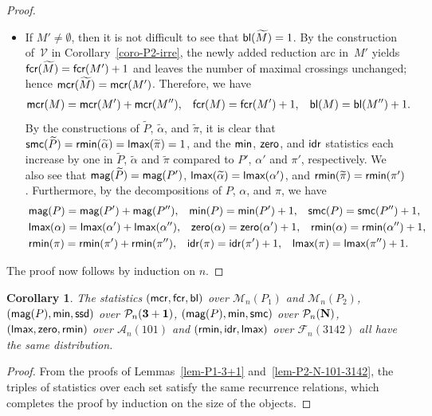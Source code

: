 \documentclass[11pt]{article}
\DeclareMathOperator{\bl}{\mbox{\sf{bl}}}
\DeclareMathOperator{\mcr}{\mbox{\sf{mcr}}}
\DeclareMathOperator{\smc}{\mbox{\sf{smc}}}
\DeclareMathOperator{\magg}{\mbox{\sf{mag}}}
\DeclareMathOperator{\minn}{\mbox{\sf{min}}}
\DeclareMathOperator{\ssd}{\mbox{\sf{ssd}}}
\DeclareMathOperator{\idr}{\mbox{\sf{idr}}}
\DeclareMathOperator{\lmax}{\mbox{\sf{lmax}}}
\DeclareMathOperator{\rmin}{\mbox{\sf{rmin}}}
\DeclareMathOperator{\zero}{\mbox{\sf{zero}}}
\DeclareMathOperator{\fcr}{\mbox{\sf{fcr}}}
\newtheorem{coro}[thm]{Corollary}
\newcommand{\A}{\mathcal{A}}
\newcommand{\PP}{{\mathcal P}}
\newcommand{\F}{\mathcal{F}}
\newcommand{\M}{\mathcal{M}}
\newcommand{\V}{\mathcal{V}}
\begin{document}
\begin{proof}
\begin{itemize}
			\item If $M' \neq \emptyset$, then it is not difficult to see that $\bl(\widetilde{M})= 1$.
			By the construction of~$\V$ in Corollary~\ref{coro-P2-irre}, the newly added reduction arc in~$M'$ yields $\fcr(\widetilde{M})=\fcr(M')+1$
			and leaves the number of maximal crossings unchanged; hence $\mcr(\widetilde{M})=\mcr(M')$.
			Therefore, we have
			\begin{align*}
				\mcr(M)= \mcr(M')+\mcr(M''), \hspace{0.3cm}  \fcr(M)=\fcr(M')+1, \hspace{0.3cm} \bl(M)=\bl(M'')+1.
			\end{align*}
			By the constructions of $\widetilde P$, $\widetilde \alpha$, and $\widetilde \pi$, it is clear that
			$\smc(\widetilde{P})=\rmin(\widetilde{\alpha})=\lmax(\widetilde{\pi})=1$,
			and the $\minn$, $\zero$, and $\idr$ statistics each increase by one in
			$\widetilde{P}$, $\widetilde{\alpha}$ and $\widetilde{\pi}$
			compared to $P'$, $\alpha'$ and $\pi'$, respectively.
			We also see that
			$\magg(\widetilde P)= \magg(P')$,
			$\lmax(\widetilde{\alpha})=\lmax(\alpha')$, and  $\rmin(\widetilde{\pi})=\rmin(\pi')$. 
			Furthermore, by the decompositions of $P$, $\alpha$, and $\pi$, we have
			\begin{align*}
				&\magg(P)=\magg(P')+\magg(P''),\hspace{0.3cm} \minn(P)=\minn(P')+1,\hspace{0.3cm}\smc(P)=\smc(P'')+1,\\ &\lmax(\alpha)=\lmax(\alpha')+\lmax(\alpha''), \hspace{0.3cm}\zero(\alpha)=\zero(\alpha')+1, \hspace{0.3cm} \rmin(\alpha)=\rmin(\alpha'')+1, \\ 
				&\rmin(\pi)=\rmin(\pi')+\rmin(\pi''), \hspace{0.3cm} \idr(\pi)=\idr(\pi')+1, \hspace{0.3cm} \lmax(\pi)=\lmax(\pi'')+1.
			\end{align*}
		\end{itemize}
		The proof now follows by induction on $n$.
	\end{proof}
	
	\begin{coro}\label{coro-equi-all}
		The statistics $(\mcr, \fcr, \bl)$ over $\M_n(P_1)$ and $\M_n(P_2)$, $(\magg(P), \minn, \ssd)$ over $\PP_n\bf{(3+1)}$, $(\magg(P), \minn, \smc)$ over $\PP_n\bf{(N)}$, $(\lmax, \zero, \rmin)$ over $\A_n(101)$ and $(\rmin, \idr, \lmax)$ over $\F_n(3142)$ all have the same distribution.
	\end{coro}
	\begin{proof}
		From the proofs of Lemmas~\ref{lem-P1-3+1} and~\ref{lem-P2-N-101-3142}, 
		the triples of statistics over each set satisfy the same recurrence relations, 
		which completes the proof by induction on the size of the objects.
	\end{proof}
	
\end{document}
